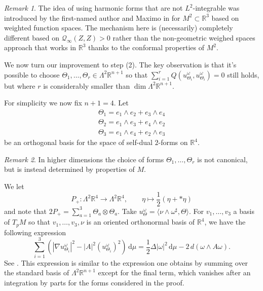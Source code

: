 \documentclass[11pt]{amsart}
\numberwithin{equation}{section}
\theoremstyle{plain}
\theoremstyle{definition}
\theoremstyle{remark}
\newtheorem{remark}[remark]{Remark}
\newcommand{\R}{\mathbb{R}}
\newcommand{\Qcal}{\mathcal Q}
\newcommand{\dvol}{\,\mathrm{d}\mu}%
\newcommand{\bangle}[1]{\langle #1 \rangle}
\begin{document}
\begin{remark}
The idea of using harmonic forms that are not $L^2$-integrable was introduced by the first-named author and Maximo in \cite{ChodoshMaximo2016} for $M^2\subset \R^3$ based on weighted function spaces. The mechanism here is (necessarily) completely different based on $\Qcal_\infty(Z,Z) > 0$ rather than the non-geometric weighed spaces approach that works in $\R^3$ thanks to the conformal properties of $M^2$. 
\end{remark}

We now turn our improvement to step (2). The key observation is that it's possible to choose $\Theta_1,\dots,\Theta_r \in \Lambda^2\R^{n+1}$ so that $\sum_{i=1}^r Q(u^\omega_{\Theta_i},u^\omega_{\Theta_i}) = 0$ still holds, but where $r$ is considerably smaller than $\dim \Lambda^2\R^{n+1}$. 

For simplicity we now fix $n+1=4$. Let 
\begin{equation}\label{eq:sd-forms-basis}
\begin{split}
\Theta_1= e_1\wedge e_2 + e_3\wedge e_4\\
\Theta_2 = e_1\wedge e_3 + e_4\wedge e_2\\
\Theta_3 = e_1\wedge e_4 + e_2\wedge e_3
\end{split}
\end{equation}
be an orthogonal basis for the space of self-dual $2$-forms on $\R^4$. 

\begin{remark}
In higher dimensions the choice of forms $\Theta_1,\dots,\Theta_r$ is not canonical, but is instead determined by properties of $M$. 
\end{remark}



We let
\[
P_+ : \Lambda^2 \R^4 \to\Lambda^2\R^4, \qquad \eta \mapsto \frac 12 ( \eta + * \eta)
\]
and note that $2P_+ = \sum_{a=1}^3\Theta_a \otimes \Theta_a$. Take $u^\omega_\Theta = \bangle{\nu \wedge \omega^\sharp,\Theta}$. For $v_1,\dots,v_3$ a basis of $T_pM$ so that $v_1,\dots,v_3,\nu$ is an oriented orthonormal basis of $\R^4$, we have the following expression
\begin{equation}\label{eq:second-var-sum-self-dual}
\sum_{i=1}^3  \left( |\nabla u^\omega_{\Theta_i}|^2 - |A|^2 (u^\omega_{\Theta_i})^2 \right) \dvol  = \frac 12 \Delta |\omega|^2 \dvol - 2 \, d(\omega \wedge A \omega).
\end{equation}
See . This expression is similar to the expression one obtains by summing over the standard basis of $\Lambda^2\R^{n+1}$ except for the final term, which vanishes after an integration by parts for the forms considered in the proof. 
\end{document}
